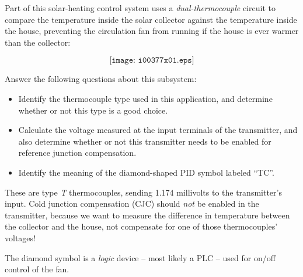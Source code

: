 

Part of this solar-heating control system uses a {\it dual-thermocouple} circuit to compare the temperature inside the solar collector against the temperature inside the house, preventing the circulation fan from running if the house is ever warmer than the collector:

$$\texttt{[image: i00377x01.eps]}$$

Answer the following questions about this subsystem:

\begin{itemize}
\item{} Identify the thermocouple type used in this application, and determine whether or not this type is a good choice.
\vskip 10pt
\item{} Calculate the voltage measured at the input terminals of the transmitter, and also determine whether or not this transmitter needs to be enabled for reference junction compensation.
\vskip 10pt
\item{} Identify the meaning of the diamond-shaped PID symbol labeled ``TC''.
\end{itemize}







These are type {\it T} thermocouples, sending 1.174 millivolts to the transmitter's input.  Cold junction compensation (CJC) should {\it not} be enabled in the transmitter, because we want to measure the difference in temperature between the collector and the house, not compensate for one of those thermocouples' voltages!

The diamond symbol is a {\it logic} device -- most likely a PLC -- used for on/off control of the fan.









